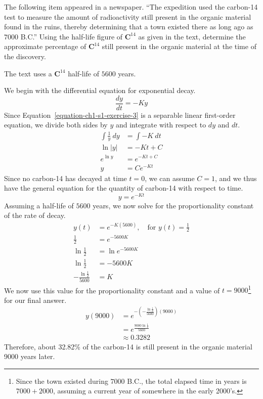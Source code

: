 \begin{exercise}
	The following item appeared in a newspaper. ``The expedition used the carbon-14 test to measure the amount of radioactivity still present in the organic material found in the ruins, thereby determining that a town existed there as long ago as $7000$ B.C.'' Using the half-life figure of $\textbf{C}^{14}$ as given in the text, determine the approximate percentage of $\textbf{C}^{14}$ still present in the organic material at the time of the discovery.
\end{exercise}
\begin{remark}
	The text uses a $\textbf{C}^{14}$ half-life of $5600$ years\supercite{ordinary-differential-equations}.
\end{remark}
\begin{solution}
	We begin with the differential equation for exponential decay.
	\begin{equation*}
	\label{equation-ch1-s1-exercise-3}
	\frac{dy}{dt} = -Ky
	\end{equation*}
	Since Equation~\ref{equation-ch1-s1-exercise-3} is a separable linear first-order equation, we divide both sides by $y$ and integrate with respect to $dy$ and $dt$.
	\begin{align*}
	\int \frac{1}{y} \ dy &= \int -K \ dt \\
	\ln \left| y \right| &= -Kt + C \\
	e^{\ln y} &= e^{-Kt + C} \\
	y &= Ce^{-Kt}
	\end{align*}
	Since no carbon-14 has decayed at time $t = 0$, we can assume $C = 1$, and we thus have the general equation for the quantity of carbon-14 with respect to time.
	\begin{equation*}
	y = e^{-Kt}
	\end{equation*}
	Assuming a half-life of $5600$ years, we now solve for the proportionality constant of the rate of decay.
	\begin{align*}
	y\left(t\right) &= e^{-K\left(5600\right)}, \quad \text{for } y\left(t\right) = \frac{1}{2} \\
	\frac{1}{2} &= e^{-5600K} \\
	\ln \frac{1}{2} &= \ln e^{-5600K} \\
	\ln \frac{1}{2} &= -5600K \\
	-\frac{\ln \frac{1}{2}}{5600} &= K
	\end{align*}
	We now use this value for the proportionality constant and a value of $t = 9000$\footnote{Since the town existed during $7000$ B.C., the total elapsed time in years is $7000 + 2000$, assuming a current year of somewhere in the early 2000's.} for our final answer.
	\begin{align*}
	y\left(9000\right) &= e^{-\left(-\frac{\ln \frac{1}{2}}{5600}\right)\left(9000\right)} \\
	&= e^{\frac{9000 \ln \frac{1}{2}}{5600}} \\
	&\approx 0.3282
	\end{align*}
	Therefore, about 32.82\% of the carbon-14 is still present in the organic material 9000 years later.
\end{solution}
